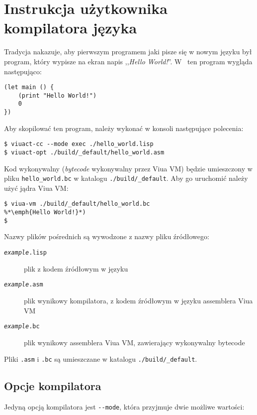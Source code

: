 \section{Instrukcja użytkownika kompilatora języka \ViuAct}
\label{viuact_manual}

Tradycja nakazuje, aby pierwszym programem jaki pisze się w nowym języku był program, który wypisze na ekran
napis ,,\emph{Hello World!}''. W \ViuAct\ ten program wygląda następująco:

\begin{lstlisting}
(let main () {
    (print "Hello World!")
    0
})
\end{lstlisting}

Aby skopilować ten program, należy wykonać w konsoli następujące polecenia:

\begin{lstlisting}
$ viuact-cc --mode exec ./hello_world.lisp
$ viuact-opt ./build/_default/hello_world.asm
\end{lstlisting}

Kod wykonywalny (\emph{bytecode} wykonywalny przez Viua VM) będzie umieszczony w pliku
\texttt{hello\_world.bc} w katalogu \texttt{./build/\_default}.
Aby go uruchomić należy użyć jądra Viua VM:

\begin{lstlisting}
$ viua-vm ./build/_default/hello_world.bc
%*\emph{Hello World!}*)
$
\end{lstlisting}

Nazwy plików pośrednich są wywodzone z nazwy pliku źródłowego:

\begin{description}
    \item[\texttt{\emph{example}.lisp}] plik z kodem źródłowym w języku \ViuAct
    \item[\texttt{\emph{example}.asm}] plik wynikowy kompilatora, z kodem źródłowym w języku assemblera Viua
        VM
    \item[\texttt{\emph{example}.bc}] plik wynikowy assemblera Viua VM, zawierający wykonywalny bytecode
\end{description}

Pliki \texttt{.asm} i \texttt{.bc} są umieszczane w katalogu \texttt{./build/\_default}.

\subsection{Opcje kompilatora}

Jedyną opcją kompilatora jest \texttt{-\phantom{}-mode}, która przyjmuje dwie możliwe wartości:

